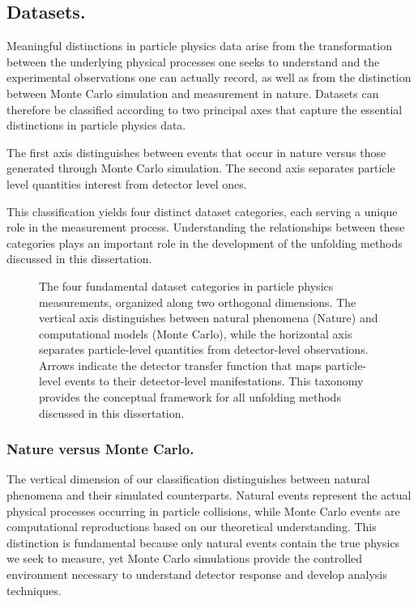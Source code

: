 \begin{definition}
\subsection{Datasets.}
    Meaningful distinctions in particle physics data arise from the transformation between the underlying physical processes one seeks to understand and the experimental observations one can actually record, as well as from the distinction between Monte Carlo simulation and measurement in nature.
    Datasets can therefore be classified according to two principal axes that capture the essential distinctions in particle physics data.
    
    The first axis distinguishes between events that occur in nature versus those generated through Monte Carlo simulation.
    The second axis separates particle level quantities interest from detector level ones.

    This classification yields four distinct dataset categories, each serving a unique role in the measurement process.
    Understanding the relationships between these categories plays an important role in the development of the unfolding methods discussed in this dissertation.
    \begin{figure}
    \centering
    
    \caption[Taxonomy of datasets used]{The four fundamental dataset categories in particle physics measurements, organized along two orthogonal dimensions. The vertical axis distinguishes between natural phenomena (Nature) and computational models (Monte Carlo), while the horizontal axis separates particle-level quantities from detector-level observations. Arrows indicate the detector transfer function that maps particle-level events to their detector-level manifestations. This taxonomy provides the conceptual framework for all unfolding methods discussed in this dissertation.}
    \label{fig:dataset-taxonomy}
    \end{figure}
    \subsubsection{Nature versus Monte Carlo.}
        The vertical dimension of our classification distinguishes between natural phenomena and their simulated counterparts. Natural events represent the actual physical processes occurring in particle collisions, while Monte Carlo events are computational reproductions based on our theoretical understanding. This distinction is fundamental because only natural events contain the true physics we seek to measure, yet Monte Carlo simulations provide the controlled environment necessary to understand detector response and develop analysis techniques.


\end{definition}
